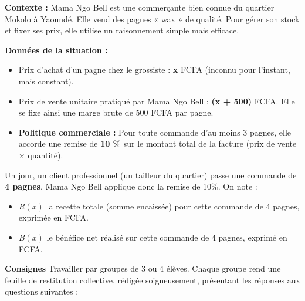 \documentclass[11pt]{article}
\begin{document}
\begin{exoresolu}
\textbf{Contexte :} Mama Ngo Bell est une commerçante bien connue du quartier Mokolo à Yaoundé. Elle vend des pagnes « wax » de qualité. Pour gérer son stock et fixer ses prix, elle utilise un raisonnement simple mais efficace.

\textbf{Données de la situation :}
\begin{itemize}
    \item Prix d'achat d'un pagne chez le grossiste : \textbf{x} FCFA (inconnu pour l'instant, mais constant).
    \item Prix de vente unitaire pratiqué par Mama Ngo Bell : \textbf{(x + 500)} FCFA. Elle se fixe ainsi une marge brute de 500 FCFA par pagne.
    \item \textbf{Politique commerciale :} Pour toute commande d'au moins 3 pagnes, elle accorde une remise de \textbf{10 \%} sur le montant total de la facture (prix de vente $\times$ quantité).
\end{itemize}

Un jour, un client professionnel (un tailleur du quartier) passe une commande de \textbf{4 pagnes}. Mama Ngo Bell applique donc la remise de 10\%.
On note :
\begin{itemize}
    \item $R(x)$ la recette totale (somme encaissée) pour cette commande de 4 pagnes, exprimée en FCFA.
    \item $B(x)$ le bénéfice net réalisé sur cette commande de 4 pagnes, exprimé en FCFA.
\end{itemize}

\textbf{Consignes}
Travailler par groupes de 3 ou 4 élèves. Chaque groupe rend une feuille de restitution collective, rédigée soigneusement, présentant les réponses aux questions suivantes :


\end{exoresolu}
\end{document}
